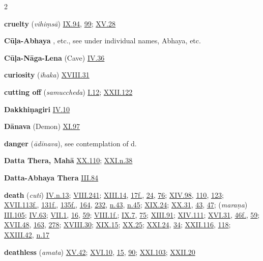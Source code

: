 \begin{multicols}{2}
\begin{vismHanging}
\par\textbf{cruelty} (\emph{vihiṃsā}) \hyperlink{IX.94}{IX.94}{}, \hyperlink{IX.99}{99}{}; \hyperlink{XV.28}{XV.28}{}
\par\textbf{Cūḷa-Abhaya} , etc., see under individual names, Abhaya, etc. 
\par\textbf{Cūḷa-Nāga-Lena} (Cave) \hyperlink{IV.36}{IV.36}{}
\par\textbf{curiosity} (\emph{īhaka}) \hyperlink{XVIII.31}{XVIII.31}{}
\par\textbf{cutting off} (\emph{samuccheda}) \hyperlink{I.12}{I.12}{}; \hyperlink{XXII.122}{XXII.122}{}
\par\textbf{Dakkhiṇagiri} \hyperlink{IV.10}{IV.10}{}
\par\textbf{Dānava} (Demon) \hyperlink{XI.97}{XI.97}{}
\par\textbf{danger} (\emph{ādīnava}), see contemplation of d.
\par\textbf{Datta Thera, Mahā} \hyperlink{XX.110}{XX.110}{}; \hyperlink{XXI.n38}{XXI.n.38}{}
\par\textbf{Datta-Abhaya Thera} \hyperlink{III.84}{III.84}{}
\par\textbf{death} (\emph{cuti}) \hyperlink{IV.n13}{IV.n.13}{}; \hyperlink{VIII.241}{VIII.241}{}; \hyperlink{XIII.14}{XIII.14}{}, \hyperlink{XIII.17}{17f.}{}, \hyperlink{XIII.24}{24}{}, \hyperlink{XIII.76}{76}{}; \hyperlink{XIV.98}{XIV.98}{}, \hyperlink{XIV.110}{110}{}, \hyperlink{XIV.123}{123}{}; \hyperlink{XVII.113}{XVII.113f.}{}, \hyperlink{XVII.131}{131f.}{}, \hyperlink{XVII.135}{135f.}{}, \hyperlink{XVII.164}{164}{}, \hyperlink{XVII.232}{232}{}, \hyperlink{XVII.n43}{n.43}{}, \hyperlink{XVII.n45}{n.45}{}; \hyperlink{XIX.24}{XIX.24}{}; \hyperlink{XX.31}{XX.31}{}, \hyperlink{XX.43}{43}{}, \hyperlink{XX.47}{47}{}; (\emph{maraṇa}) \hyperlink{III.105}{III.105}{}; \hyperlink{IV.63}{IV.63}{}; \hyperlink{VII.1}{VII.1}{}, \hyperlink{VII.16}{16}{}, \hyperlink{VII.59}{59}{}; \hyperlink{VIII.1}{VIII.1f.}{}; \hyperlink{IX.7}{IX.7}{}, \hyperlink{IX.75}{75}{}; \hyperlink{XIII.91}{XIII.91}{}; \hyperlink{XIV.111}{XIV.111}{}; \hyperlink{XVI.31}{XVI.31}{}, \hyperlink{XVI.46}{46f.}{}, \hyperlink{XVI.59}{59}{}; \hyperlink{XVII.48}{XVII.48}{}, \hyperlink{XVII.163}{163}{}, \hyperlink{XVII.278}{278}{}; \hyperlink{XVIII.30}{XVIII.30}{}; \hyperlink{XIX.15}{XIX.15}{}; \hyperlink{XX.25}{XX.25}{}; \hyperlink{XXI.24}{XXI.24}{}, \hyperlink{XXI.34}{34}{}; \hyperlink{XXII.116}{XXII.116}{}, \hyperlink{XXII.118}{118}{}; \hyperlink{XXIII.42}{XXIII.42}{}, \hyperlink{XXIII.n17}{n.17}{}
\par\textbf{deathless} (\emph{amata}) \hyperlink{XV.42}{XV.42}{}; \hyperlink{XVI.10}{XVI.10}{}, \hyperlink{XVI.15}{15}{}, \hyperlink{XVI.90}{90}{}; \hyperlink{XXI.103}{XXI.103}{}; \hyperlink{XXII.20}{XXII.20}{}

\end{vismHanging}
\end{multicols}
